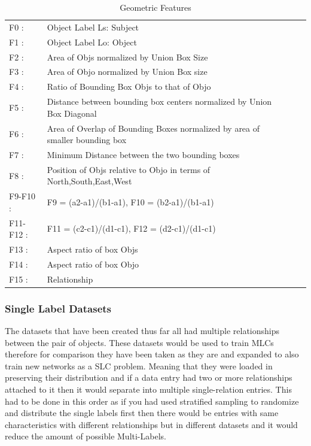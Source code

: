 \documentclass{csfyp}
\begin{document}
\begin{table}[!htbp]
\centering
\begin{tabular}{|l|l|lll}
\cline{1-2}
F0 : & Object Label Ls: Subject \\ \cline{1-2}
F1 : & Object Label Lo: Object  \\ \cline{1-2}
F2 : & Area of Objs normalized by Union Box Size \\ \cline{1-2}
F3 : & Area of Objo normalized by Union Box size \\ \cline{1-2}
F4 : &  Ratio of Bounding Box Objs to that of Objo  \\ \cline{1-2}
F5 : &  Distance between bounding box centers normalized by Union Box Diagonal \\ \cline{1-2}
F6 : & Area of Overlap of Bounding Boxes normalized by area of smaller bounding box \\ \cline{1-2}
F7 : & Minimum Distance between the two bounding boxes \\ \cline{1-2}
F8 : & Position of Objs relative to Objo in terms of North,South,East,West \\ \cline{1-2}
F9-F10 : & F9 = (a2-a1)/(b1-a1), F10 = (b2-a1)/(b1-a1) \\ \cline{1-2}
F11-F12 : & F11 = (c2-c1)/(d1-c1), F12 = (d2-c1)/(d1-c1) \\ \cline{1-2}
F13 : & Aspect ratio of box Objs \\ \cline{1-2}
F14 : & Aspect ratio of box Objo \\ \cline{1-2}
F15 : & Relationship \\ \cline{1-2}
\end{tabular}
\caption{Geometric Features}
\end{table}

\subsubsection{Single Label Datasets}
The datasets that have been created thus far all had multiple relationships between the pair of objects. These datasets would be used to train MLCs therefore for comparison they have been taken as they are and expanded to also train new networks as a SLC problem. Meaning that they were loaded in preserving their distribution and if a data entry had two or more relationships attached to it then it would separate into multiple single-relation entries. This had to be done in this order as if you had used stratified sampling to randomize and distribute the single labels first then there would be entries with same characteristics with different relationships but in different datasets and it would reduce the amount of possible Multi-Labels.
\end{document}
